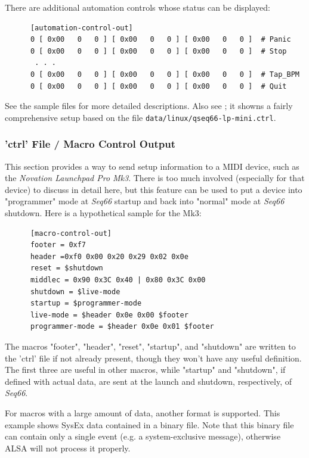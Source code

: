    There are additional automation controls whose status can be displayed:

   \begin{verbatim}
      [automation-control-out]
      0 [ 0x00   0   0 ] [ 0x00   0   0 ] [ 0x00   0   0 ]  # Panic
      0 [ 0x00   0   0 ] [ 0x00   0   0 ] [ 0x00   0   0 ]  # Stop
       . . .
      0 [ 0x00   0   0 ] [ 0x00   0   0 ] [ 0x00   0   0 ]  # Tap_BPM
      0 [ 0x00   0   0 ] [ 0x00   0   0 ] [ 0x00   0   0 ]  # Quit
   \end{verbatim}

   See the sample files for more detailed descriptions.
   Also see ; it showns a fairly comprehensive
   setup based on the file \texttt{data/linux/qseq66-lp-mini.ctrl}.

\subsubsection{'ctrl' File / Macro Control Output}
\label{subsubsec:configuration_ctrl_macro_control_out}

   This section provides a way to send setup information to a MIDI device,
   such as the \textsl{Novation Launchpad Pro Mk3}.
   There is too much involved (especially for that device) to discuss in
   detail here, but this feature can be used to put a device into
   "programmer" mode at \textsl{Seq66} startup and back into
   "normal" mode at \textsl{Seq66} shutdown.
   Here is a hypothetical sample for the Mk3:

   \begin{verbatim}
      [macro-control-out]
      footer = 0xf7
      header =0xf0 0x00 0x20 0x29 0x02 0x0e 
      reset = $shutdown
      middlec = 0x90 0x3C 0x40 | 0x80 0x3C 0x00
      shutdown = $live-mode
      startup = $programmer-mode
      live-mode = $header 0x0e 0x00 $footer
      programmer-mode = $header 0x0e 0x01 $footer
   \end{verbatim}

   The macros "footer", "header", "reset", "startup", and "shutdown"
   are written to the 'ctrl' file if not already present, though
   they won't have any useful definition.
   The first three are useful in other macros, while "startup" and
   "shutdown", if defined with actual data, are sent at the launch
   and shutdown, respectively, of \textsl{Seq66}.

   For macros with a large amount of data, another format is
   supported.
   This example shows SysEx data contained in a binary file.
   Note that this binary file can contain only a single event (e.g.
   a system-exclusive message), otherwise ALSA will not process
   it properly.

